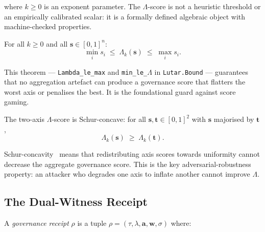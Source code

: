 where \(k \geq 0\) is an exponent parameter.
The \(\Lambda\)-score is not a heuristic threshold or an empirically
calibrated scalar: it is a formally defined algebraic object with
machine-checked properties.

\begin{theorem}
\label{thm:lambda-bound}
  For all \(k \geq 0\) and all \(\mathbf{s} \in [0,1]^n\):
  \[
    \min_i s_i \;\leq\; \Lambda_k(\mathbf{s}) \;\leq\; \max_i s_i.
  \]
\end{theorem}

\noindent
This theorem --- \texttt{Lambda\_le\_max} and \texttt{min\_le\_\(\Lambda\)} in
\texttt{Lutar.Bound} --- guarantees that no aggregation artefact can
produce a governance score that flatters the worst axis or penalises
the best.
It is the foundational guard against score gaming.

\begin{theorem}
\label{thm:schur}
  The two-axis \(\Lambda\)-score is Schur-concave: for all
  \(\mathbf{s}, \mathbf{t} \in [0,1]^2\) with \(\mathbf{s}\) majorised
  by \(\mathbf{t}\),
  \[
    \Lambda_k(\mathbf{s}) \;\geq\; \Lambda_k(\mathbf{t}).
  \]
\end{theorem}

\noindent
Schur-concavity~\cite{hardy1934inequalities,marshall2011inequalities} means
that redistributing axis scores towards uniformity cannot decrease the
aggregate governance score.
This is the key adversarial-robustness property: an attacker who degrades
one axis to inflate another cannot improve \(\Lambda\).

\subsection{The Dual-Witness Receipt}
\label{ssec:receipts}

\begin{definition}
\label{def:receipt}
  A \emph{governance receipt} \(\rho\) is a tuple
  \(\rho = (\tau, \lambda, \mathbf{a}, \mathbf{w}, \sigma)\) where:
\end{definition}

